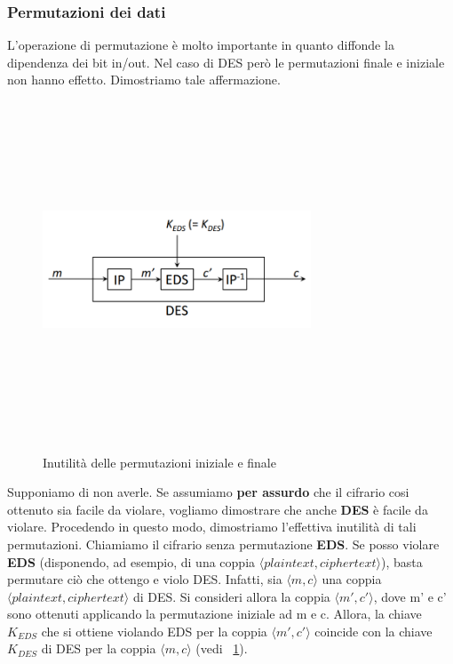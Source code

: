 \subsubsection{Permutazioni dei dati}
L'operazione di permutazione è molto importante in quanto diffonde la dipendenza dei bit in/out. Nel caso di DES però le permutazioni finale e iniziale non hanno effetto. Dimostriamo tale affermazione. \newline \newline
\begin{figure}[htbp]
	\centering%
	\subfigure%
	{\includegraphics[height=10cm, width=8cm, keepaspectratio]{Immagini/chiave_segreta/des_perm_3.png}}
	\caption{Inutilità delle permutazioni iniziale e finale \label{fig:des_perm_3}} 	
\end{figure}
Supponiamo di non averle. Se assumiamo \textbf{per assurdo} che il cifrario cosi ottenuto sia facile da violare, vogliamo dimostrare che anche \textbf{DES} è facile da violare. Procedendo in questo modo, dimostriamo l'effettiva inutilità di tali permutazioni. 
\newline \newline
Chiamiamo il cifrario senza permutazione \textbf{EDS}. Se posso violare \textbf{EDS} (disponendo, ad esempio, di una coppia $\langle plaintext, ciphertext \rangle$), basta permutare ciò che ottengo e violo DES. Infatti, sia $\langle m, c \rangle$ una coppia $\langle plaintext, ciphertext \rangle$ di DES. Si consideri allora la coppia $\langle m', c' \rangle$, dove m' e c' sono ottenuti applicando la permutazione iniziale ad m e c. Allora, la chiave $K_{EDS}$ che si ottiene violando EDS per la
coppia $\langle m', c' \rangle$ coincide con la chiave $K_{DES}$ di DES per la
coppia $\langle m, c \rangle$ (vedi \figurename ~\ref{fig:des_perm_3}). \\

